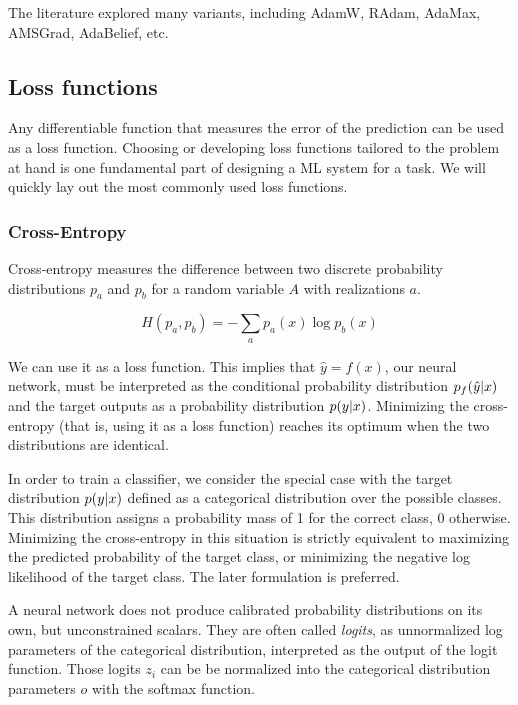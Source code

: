 The literature explored many variants, including AdamW, RAdam, AdaMax, AMSGrad, AdaBelief, etc.

\subsection{Loss functions}

Any differentiable function that measures the error of the prediction can be used as a loss function. Choosing or developing loss functions tailored to the problem at hand is one fundamental part of designing a ML system for a task. We will quickly lay out the most commonly used loss functions. 

\subsubsection{Cross-Entropy}

Cross-entropy measures the difference between two discrete probability distributions $p_a$ and $p_b$ for a random variable $A$ with realizations $a$.

\begin{equation}
    H(p_a, p_b) = - \sum_a p_a(x) \log p_b(x)
\end{equation}

We can use it as a loss function. This implies that $\hat{y}=f(x)$, our neural network, must be interpreted as the conditional probability distribution $p_f(\hat{y}|x)$ and the target outputs as a probability distribution $p(y|x)$. Minimizing the cross-entropy (that is, using it as a loss function) reaches its optimum when the two distributions are identical.

In order to train a classifier, we consider the special case with the target distribution $p(y|x)$ defined as a categorical distribution over the possible classes. This distribution assigns a probability mass of 1 for the correct class, 0 otherwise. Minimizing the cross-entropy in this situation is strictly equivalent to maximizing the predicted probability of the target class, or minimizing the negative log likelihood of the target class. The later formulation is preferred.

A neural network does not produce calibrated probability distributions on its own, but unconstrained scalars. They are often called \emph{logits}, as unnormalized log parameters of the categorical distribution, interpreted as the output of the logit function. Those logits $z_i$ can be be normalized into the categorical distribution parameters $o$ with the softmax function.

